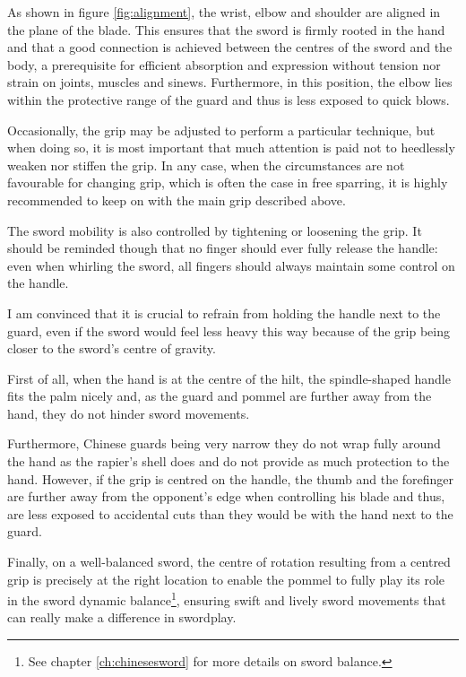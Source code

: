 As shown in figure \ref{fig:alignment}, the wrist, elbow and shoulder are aligned in the plane of the blade.
This ensures that the sword is firmly rooted in the hand and that a good connection is achieved between the centres of the sword and the body, a prerequisite for efficient absorption and expression without tension nor strain on joints, muscles and sinews.
Furthermore, in this position, the elbow lies within the protective range of the guard and thus is less exposed to quick blows.

Occasionally, the grip may be adjusted to perform a particular technique, but when doing so, it is most important that much attention is paid not to heedlessly weaken nor stiffen the grip.
In any case, when the circumstances are not favourable for changing grip, which is often the case in free sparring, it is highly recommended to keep on with the main grip described above.

The sword  mobility is also controlled by tightening or loosening the grip. 
It should be reminded though that no finger should ever fully release the handle: even when whirling the sword, all fingers should always maintain some control on the handle. 

I am convinced that it is crucial to refrain from holding the handle next to the guard, even if the sword would feel less heavy this way because of the grip being closer to the sword's centre of gravity.

First of all, when the hand is at the centre of the hilt, the spindle-shaped handle fits the palm nicely and, as the guard and pommel are further away from the hand, they do not hinder sword movements.

Furthermore, Chinese guards being very narrow they do not wrap fully around the hand as the rapier's shell does and do not provide as much protection to the hand. However, if the grip is centred on the handle, the thumb and the forefinger are further away from the opponent's edge when controlling his blade and thus, are less exposed to accidental cuts than they would be with the hand next to the guard.

Finally, on a well-balanced sword, the centre of rotation resulting from a centred grip is precisely at the right location to enable the pommel to fully play its role in the sword dynamic balance\footnote{See chapter \ref*{ch:chinesesword} for more details on sword balance.}, ensuring swift and lively sword movements that can really make a difference in swordplay.

